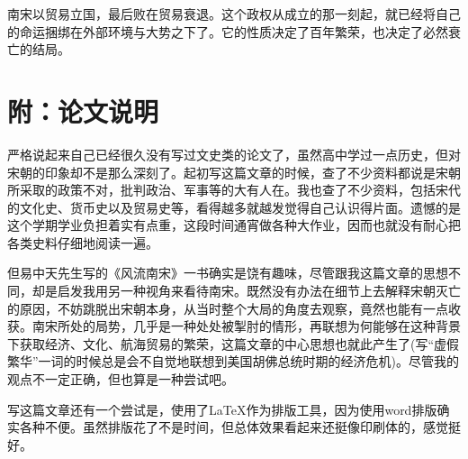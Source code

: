 \documentclass[final]{cvpr}
\begin{document}
南宋以贸易立国，最后败在贸易衰退。这个政权从成立的那一刻起，就已经将自己的命运捆绑在外部环境与大势之下了。它的性质决定了百年繁荣，也决定了必然衰亡的结局。

\section{附：论文说明}

严格说起来自己已经很久没有写过文史类的论文了，虽然高中学过一点历史，但对宋朝的印象却不是那么深刻了。起初写这篇文章的时候，查了不少资料都说是宋朝所采取的政策不对，批判政治、军事等的大有人在。我也查了不少资料，包括宋代的文化史、货币史以及贸易史等，看得越多就越发觉得自己认识得片面。遗憾的是这个学期学业负担着实有点重，这段时间通宵做各种大作业，因而也就没有耐心把各类史料仔细地阅读一遍。

但易中天先生写的《风流南宋》一书确实是饶有趣味，尽管跟我这篇文章的思想不同，却是启发我用另一种视角来看待南宋。既然没有办法在细节上去解释宋朝灭亡的原因，不妨跳脱出宋朝本身，从当时整个大局的角度去观察，竟然也能有一点收获。南宋所处的局势，几乎是一种处处被掣肘的情形，再联想为何能够在这种背景下获取经济、文化、航海贸易的繁荣，这篇文章的中心思想也就此产生了(写“虚假繁华”一词的时候总是会不自觉地联想到美国胡佛总统时期的经济危机)。尽管我的观点不一定正确，但也算是一种尝试吧。

写这篇文章还有一个尝试是，使用了LaTeX作为排版工具，因为使用word排版确实各种不便。虽然排版花了不是时间，但总体效果看起来还挺像印刷体的，感觉挺好。

\newpage

{\small


}

\end{document}
